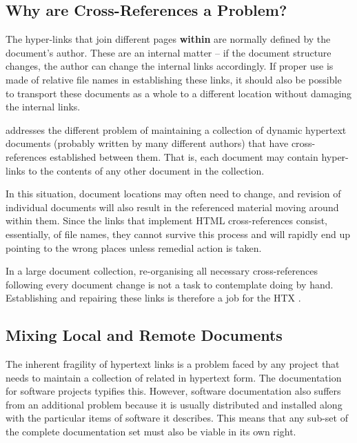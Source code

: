 \subsection{Why are Cross-References a Problem?}

The hyper-links that join different  pages {\bf within}
 are normally defined by the document's
author.  These are an internal matter -- if the document structure
changes, the author can change the internal links accordingly.  If
proper use is made of relative file names in establishing these links,
it should also be possible to transport these documents as a whole to
a different location without damaging the internal links.

 addresses the different problem of maintaining a
collection of dynamic hypertext documents (probably written by many
different authors) that have cross-references established between
them. That is, each document may contain hyper-links to the contents
of any other document in the collection.

In this situation, document locations may often need to change, and
revision of individual documents will also result in the referenced
material moving around within them.  Since the links that implement
HTML cross-references consist, essentially, of file names, they cannot
survive this process and will rapidly end up pointing to the wrong
places unless remedial action is taken.

In a large document collection, re-organising all necessary
cross-references following every document change is not a task to
contemplate doing by hand. Establishing and repairing these links is
therefore a job for the HTX .

\subsection{Mixing Local and Remote Documents}

The inherent fragility of hypertext links is a problem faced by any
project that needs to maintain a collection of related
 in hypertext form. The documentation for software
projects typifies this.  However, software documentation also suffers
from an additional problem because it is usually distributed and
installed along with the particular items of software it
describes. This means that any sub-set of the complete documentation
set must also be viable in its own right.

